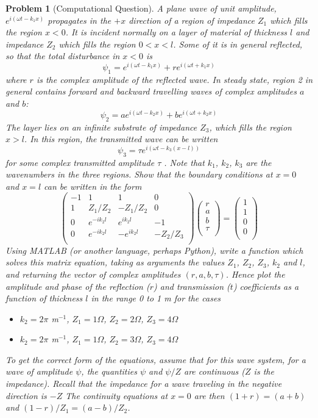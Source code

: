 \documentclass[a4paper]{article}
\theoremstyle{new}
\newtheorem{qns}{Problem}[section]
\begin{document}
\begin{qns}[Computational Question]
A plane wave of unit amplitude, $e^{i(\omega t-k_1x)}$ propagates in the $+x$ direction of a region of impedance $Z_1$ which fills the region $x < 0$. It is incident normally on a layer of material of thickness $l$ and impedance $Z_2$ which fills the region $0 < x < l$. Some of it is in general reflected, so that the total disturbance in $x < 0$ is
$$\psi_1=e^{i(\omega t-k_1x)}+re^{i(\omega t+k_1x)}$$
where $r$ is the complex amplitude of the reflected wave. In steady state, region 2 in general contains forward and backward travelling waves of complex amplitudes $a$ and $b$:
$$\psi_2=ae^{i(\omega t-k_2x)}+be^{i(\omega t+k_2x)}$$
The layer lies on an infinite substrate of impedance $Z_3$, which fills the region $x > l$. In this region, the transmitted wave can be written
$$\psi_3=\tau e^{i(\omega t-k_3(x-l))}$$
for some complex transmitted amplitude $\tau$ . Note that $k_1$, $k_2$, $k_3$ are the wavenumbers in the three regions. Show that the boundary conditions at $x = 0$ and $x = l$ can be written in the form
$$\begin{pmatrix}-1&1&1&0\\1&Z_1/Z_2&-Z_1/Z_2&0\\0&e^{-ik_2l}&e^{ik_2l}&-1\\0&e^{-ik_2l}&-e^{ik_2l}&-Z_2/Z_3\\\end{pmatrix}\begin{pmatrix}r\\a\\b\\\tau\\\end{pmatrix}=\begin{pmatrix}1\\1\\0\\0\\\end{pmatrix}$$
Using MATLAB (or another language, perhaps Python), write a function which solves this matrix equation, taking as arguments the values $Z_1$, $Z_2$, $Z_3$, $k_2$ and $l$, and returning the vector of complex amplitudes $(r,a,b,\tau)$. Hence plot the amplitude and phase of the reflection ($r$) and transmission ($t$) coefficients as a function of thickness $l$ in the range 0 to 1 m for the cases
\begin{itemize}
    \item $k_2=2\pi$ m$^{-1}$, $Z_1=1\Omega$, $Z_2=2\Omega$, $Z_3=4\Omega$
    \item $k_2=2\pi$ m$^{-1}$, $Z_1=1\Omega$, $Z_2=3\Omega$, $Z_3=4\Omega$
\end{itemize}
To get the correct form of the equations, assume that for this wave system, for a wave of amplitude $\psi$, the
quantities $\psi$ and $\psi/Z$ are continuous ($Z$ is the impedance). Recall that the impedance for a wave traveling in the negative direction is $-Z$ The continuity equations at $x = 0$ are then $(1 + r) = (a + b)$ and $(1-r)/Z_1=(a-b)/Z_2$. 
\end{qns}
\end{document}
